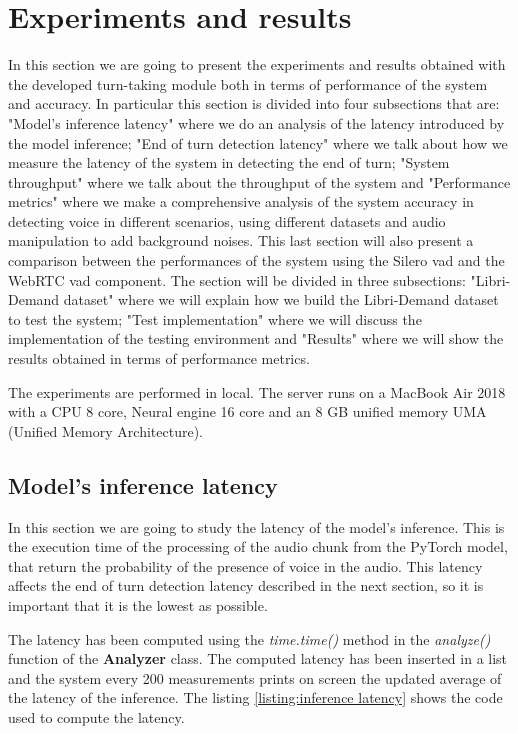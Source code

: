 \documentclass[../main.tex]{subfiles}
\begin{document}
\section{Experiments and results}

In this section we are going to present the experiments and results obtained with the developed turn-taking module both in terms of performance of the system and accuracy. In particular this section is divided into four subsections that are:  "Model's inference latency" where we do an analysis of the latency introduced by the model inference; "End of turn detection latency" where we talk about how we measure the latency of the system in detecting the end of turn; "System throughput" where we talk about the throughput of the system and "Performance metrics" where we make a comprehensive analysis of the system accuracy in detecting voice in different scenarios, using different datasets and audio manipulation to add background noises. This last section will also present a comparison between the performances of the system using the Silero vad and the WebRTC vad component. The section will be divided in three subsections: "Libri-Demand dataset" where we will explain how we build the Libri-Demand dataset to test the system; "Test implementation" where we will discuss the implementation of the testing environment and "Results" where we will show the results obtained in terms of performance metrics. 

The experiments are performed in local. The server runs on a MacBook Air 2018 with a CPU 8 core, Neural engine 16 core and an 8 GB unified memory UMA (Unified Memory Architecture). 

\subsection{Model's inference latency}

In this section we are going to study the latency of the model's inference. This is the execution time of the processing of the audio chunk from the PyTorch model, that return the probability of the presence of voice in the audio. This latency affects the end of turn detection latency described in the next section, so it is important that it is the lowest as possible. 

The latency has been computed using the \textit{time.time()} method in the \textit{analyze()} function of the \textbf{Analyzer} class. The computed latency has been inserted in a list and the system every 200 measurements prints on screen the updated average of the latency of the inference. The listing \ref{listing:inference latency} shows the code used to compute the latency.
\end{document}
